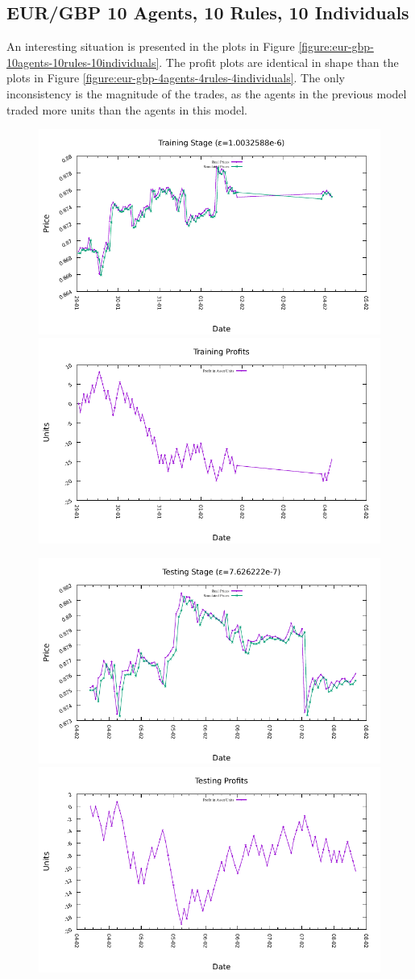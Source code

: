 \newpage

\subsection{EUR/GBP 10 Agents, 10 Rules, 10 Individuals}
\label{results:forecast-eur-gbp-10agents-10rules-10individuals}

An interesting situation is presented in the plots in Figure
\ref{figure:eur-gbp-10agents-10rules-10individuals}. The profit plots are
identical in shape than the plots in Figure
\ref{figure:eur-gbp-4agents-4rules-4individuals}. The only inconsistency is the
magnitude of the trades, as the agents in the previous model traded more units
than the agents in this model.

\begin{figure}[htp]
  \centering

  \includegraphics[width=.45\textwidth]{img/plots/eur_gbp_h1-10agents-10rules-10ind-100gen_training_fit.pdf}\quad
  \includegraphics[width=.45\textwidth]{img/plots/eur_gbp_h1-10agents-10rules-10ind-100gen_training_profits.pdf}

  \medskip

  \includegraphics[width=.45\textwidth]{img/plots/eur_gbp_h1-10agents-10rules-10ind-100gen_testing_fit.pdf}\quad
  \includegraphics[width=.45\textwidth]{img/plots/eur_gbp_h1-10agents-10rules-10ind-100gen_testing_profits.pdf}


\end{figure}
